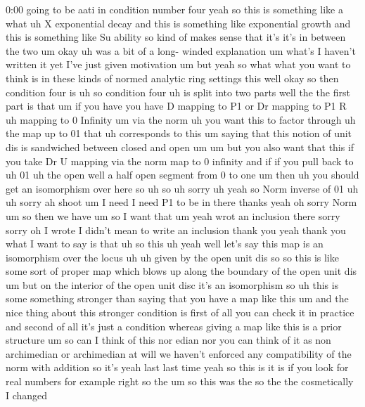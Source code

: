\begin{unfinished}{0:00}
going  to  be  aati  in  condition  number
four  yeah  so  this  is  something  like  a
what
uh  X  exponential  decay  and  this  is
something  like  exponential  growth  and
this  is  something  like  Su  ability  so
kind  of  makes  sense  that  it's  it's  in
between  the
two  um
okay  uh  was  a  bit  of  a  long-  winded
explanation
um  what's  I  haven't  written  it  yet  I've
just  given
motivation
um  but  yeah  so  what  what  you  want  to
think  is  in  these  kinds  of  normed
analytic  ring  settings  this  well  okay
so  then  condition  four
is
uh  so  condition
four  uh  is  split  into  two  parts  well  the
the  first  part  is  that  um  if  you  have
you  have  D  mapping  to  P1  or  Dr  mapping
to  P1  R  uh  mapping  to  0  Infinity  um  via
the  norm  uh  you  want  this  to  factor
through  uh  the  map  up  to
01  that  uh  corresponds  to
this  um  saying  that  this  notion  of  unit
dis  is  sandwiched  between  closed  and
open
um  um  but  you  also  want  that  this  if  you
take  Dr  U  mapping  via  the  norm  map  to  0
infinity  and  if  if  you  pull  back  to  uh
01  uh  the
open  well  a  half  open  segment  from  0  to
one  um
then  uh  you  should  get  an  isomorphism
over  here  so  uh
so  uh  sorry
uh  yeah  so  Norm  inverse  of  01  uh  uh
sorry  ah  shoot  um  I  need  I  need  P1  to  be
in  there  thanks
yeah  oh  sorry
Norm  um  so  then  we
have
um  so  I  want  that
um  yeah  wrot  an  inclusion  there  sorry
sorry  oh  I  wrote  I  didn't  mean  to  write
an  inclusion  thank  you  yeah  thank  you
what  I  want  to  say  is  that  uh  so  this  uh
yeah
well  let's  say  this  map  is  an
isomorphism  over  the  locus  uh  uh  given
by  the  open  unit
dis  so  so  this  is  like  some  sort  of
proper  map  which  blows  up  along  the
boundary  of  the  open  unit  dis  um  but  on
the  interior  of  the  open  unit  disc  it's
an
isomorphism  so  uh  this  is  some
something  stronger  than  saying  that  you
have  a  map  like  this  um  and  the  nice
thing  about  this  stronger  condition  is
first  of  all  you  can  check  it  in
practice  and  second  of  all  it's  just  a
condition  whereas  giving  a  map  like  this
is  a  prior
structure  um  so  can  I  think  of  this  nor
edian  nor  you  can  think  of  it  as  non
archimedian  or  archimedian  at  will  we
haven't  enforced  any  compatibility  of
the  norm  with
addition
so  it's
yeah  last  last  time  yeah  so  this
is  it  is  if  you  look  for  real  numbers
for  example  right  so  the  um  so  this  was
the  so  the  the  cosmetically  I  changed

\end{unfinished}
